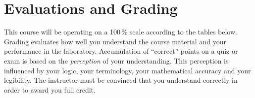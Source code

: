 \documentclass[11pt,letterpaper]{article}
\begin{document}
%
%

\section{Evaluations and Grading}
This course will be operating on a 100\,\% scale according to
the tables below. Grading evaluates how well you understand the course material
and your performance in the laboratory.  Accumulation of ``correct'' points on a
quiz or exam is based on the \emph{perception} of your understanding. This
perception is influenced by your logic, your terminology, your mathematical
accuracy and your legibility. The instructor must be convinced that you
understand correctly in order to award you full credit.
\end{document}
